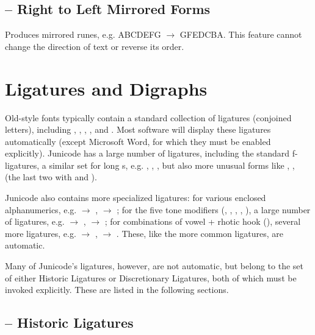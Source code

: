 \subsection{
– Right to Left Mirrored Forms}
Produces mirrored runes, e.g. {ABCDEFG $\rightarrow $ GFEDCBA}.
This feature cannot change the direction of text or reverse its order.

\section{Ligatures and Digraphs}

Old-style fonts typically contain a standard collection of ligatures (conjoined letters), including
, , , , and .
Most software will display these ligatures automatically (except
Microsoft Word, for which they must be enabled explicitly). Junicode has a large number of ligatures,
including the standard f-ligatures, a similar set for long s, e.g. , , , but also
more unusual forms like ,
,
(the last two with  and ).

Junicode also contains more specialized ligatures: for various enclosed alphanumerics, e.g.
 $\rightarrow $ ,  $\rightarrow $ ;
for the five tone modifiers
(, , , , ), a large number of
ligatures, e.g.  $\rightarrow $ ,
 $\rightarrow $ ;
for combinations of vowel + rhotic hook (), several more ligatures, e.g.  $\rightarrow $ ,
 $\rightarrow $ .
These, like the more common ligatures, are automatic.

Many of Junicode’s
ligatures, however, are not automatic, but belong to the set of either Historic Ligatures
or Discretionary Ligatures, both of which must be invoked explicitly. These are listed in the following sections.

\subsection{ – Historic Ligatures}


